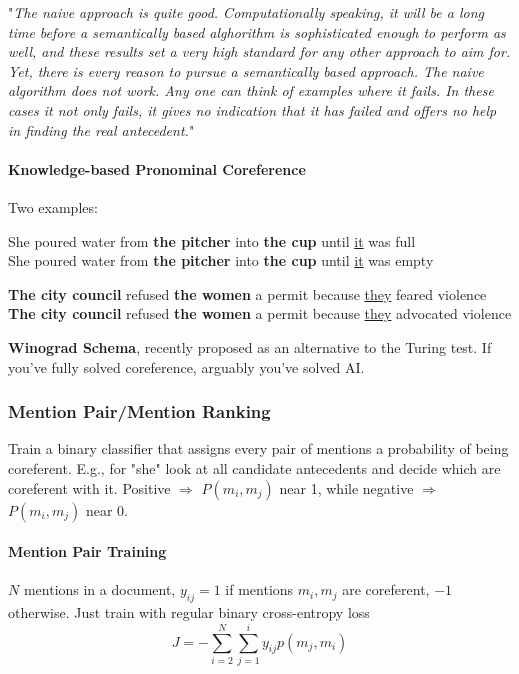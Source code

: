 \documentclass[10pt]{report}
\begin{document}
"\textit{The naive approach is quite good. Computationally speaking, it will be a long time before a semantically based alghorithm is sophisticated enough to perform as well, and these results set a very high standard for any other approach to aim for.\\Yet, there is every reason to pursue a semantically based approach. The naive algorithm does not work. Any one can think of examples where it fails. In these cases it not only fails, it gives no indication that it has failed and offers no help in finding the real antecedent.}"
\paragraph{Knowledge-based Pronominal Coreference} Two examples:
\begin{list}{}{}
	\item She poured water from \textbf{the pitcher} into \textbf{the cup} until \underline{it} was full\\
	She poured water from \textbf{the pitcher} into \textbf{the cup} until \underline{it} was empty
	\item \textbf{The city council} refused \textbf{the women} a permit because \underline{they} feared violence\\
	\textbf{The city council} refused \textbf{the women} a permit because \underline{they} advocated violence
\end{list}
\textbf{Winograd Schema}, recently proposed as an alternative to the Turing test. If you've fully solved coreference, arguably you've solved AI.
\subsubsection{Mention Pair/Mention Ranking} Train a binary classifier that assigns every pair of mentions a probability of being coreferent. E.g., for "she" look at all candidate antecedents and decide which are coreferent with it. Positive $\Rightarrow$ $P(m_i, m_j)$ near 1, while negative $\Rightarrow$ $P(m_i, m_j)$ near 0.
\paragraph{Mention Pair Training} $N$ mentions in a document, $y_{ij}=1$ if mentions $m_i,m_j$ are coreferent, $-1$ otherwise. Just train with regular binary cross-entropy loss
$$J = -\sum_{i=2}^N\sum_{j=1}^i y_{ij}p(m_j,m_i)$$
\end{document}
